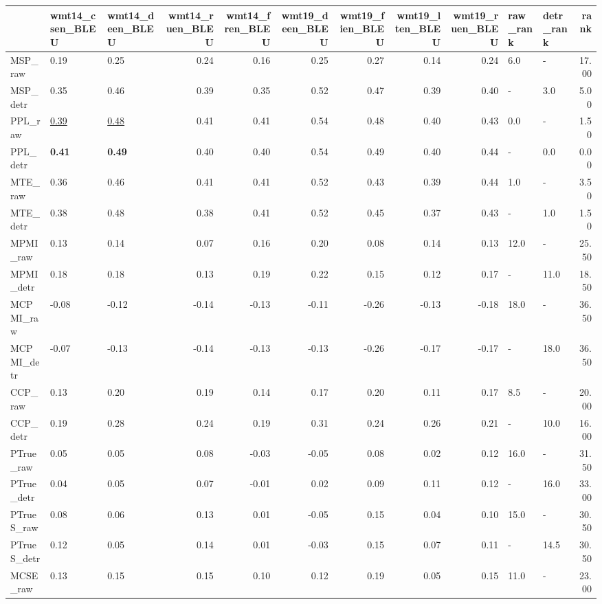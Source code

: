 \begin{tabular}{lllrrrrrrllr}
\toprule
\midrule
 & wmt14\_csen\_BLEU & wmt14\_deen\_BLEU & wmt14\_ruen\_BLEU & wmt14\_fren\_BLEU & wmt19\_deen\_BLEU & wmt19\_fien\_BLEU & wmt19\_lten\_BLEU & wmt19\_ruen\_BLEU & raw\_rank & detr\_rank & rank \\
\midrule
\midrule
MSP\_raw & 0.19 & 0.25 & 0.24 & 0.16 & 0.25 & 0.27 & 0.14 & 0.24 & 6.0 & - & 17.00 \\
MSP\_detr & 0.35 & 0.46 & 0.39 & 0.35 & 0.52 & 0.47 & 0.39 & 0.40 & - & 3.0 & 5.00 \\
\midrule
PPL\_raw & \underline{0.39} & \underline{0.48} & 0.41 & 0.41 & 0.54 & 0.48 & 0.40 & 0.43 & 0.0 & - & 1.50 \\
PPL\_detr & \textbf{0.41} & \textbf{0.49} & 0.40 & 0.40 & 0.54 & 0.49 & 0.40 & 0.44 & - & 0.0 & 0.00 \\
\midrule
MTE\_raw & 0.36 & 0.46 & 0.41 & 0.41 & 0.52 & 0.43 & 0.39 & 0.44 & 1.0 & - & 3.50 \\
MTE\_detr & 0.38 & 0.48 & 0.38 & 0.41 & 0.52 & 0.45 & 0.37 & 0.43 & - & 1.0 & 1.50 \\
\midrule
MPMI\_raw & 0.13 & 0.14 & 0.07 & 0.16 & 0.20 & 0.08 & 0.14 & 0.13 & 12.0 & - & 25.50 \\
MPMI\_detr & 0.18 & 0.18 & 0.13 & 0.19 & 0.22 & 0.15 & 0.12 & 0.17 & - & 11.0 & 18.50 \\
\midrule
MCPMI\_raw & -0.08 & -0.12 & -0.14 & -0.13 & -0.11 & -0.26 & -0.13 & -0.18 & 18.0 & - & 36.50 \\
MCPMI\_detr & -0.07 & -0.13 & -0.14 & -0.13 & -0.13 & -0.26 & -0.17 & -0.17 & - & 18.0 & 36.50 \\
\midrule
CCP\_raw & 0.13 & 0.20 & 0.19 & 0.14 & 0.17 & 0.20 & 0.11 & 0.17 & 8.5 & - & 20.00 \\
CCP\_detr & 0.19 & 0.28 & 0.24 & 0.19 & 0.31 & 0.24 & 0.26 & 0.21 & - & 10.0 & 16.00 \\
\midrule
PTrue\_raw & 0.05 & 0.05 & 0.08 & -0.03 & -0.05 & 0.08 & 0.02 & 0.12 & 16.0 & - & 31.50 \\
PTrue\_detr & 0.04 & 0.05 & 0.07 & -0.01 & 0.02 & 0.09 & 0.11 & 0.12 & - & 16.0 & 33.00 \\
\midrule
PTrueS\_raw & 0.08 & 0.06 & 0.13 & 0.01 & -0.05 & 0.15 & 0.04 & 0.10 & 15.0 & - & 30.50 \\
PTrueS\_detr & 0.12 & 0.05 & 0.14 & 0.01 & -0.03 & 0.15 & 0.07 & 0.11 & - & 14.5 & 30.50 \\
\midrule
MCSE\_raw & 0.13 & 0.15 & 0.15 & 0.10 & 0.12 & 0.19 & 0.05 & 0.15 & 11.0 & - & 23.00 \\

\end{tabular}
